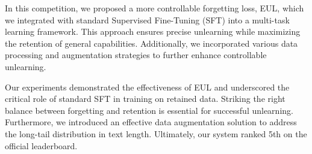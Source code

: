 \documentclass[11pt]{article}
\begin{document}

In this competition, we proposed a more controllable forgetting loss, EUL, which we integrated with standard Supervised Fine-Tuning (SFT) into a multi-task learning framework. This approach ensures precise unlearning while maximizing the retention of general capabilities. Additionally, we incorporated various data processing and augmentation strategies to further enhance controllable unlearning.

Our experiments demonstrated the effectiveness of EUL and underscored the critical role of standard SFT in training on retained data. Striking the right balance between forgetting and retention is essential for successful unlearning. Furthermore, we introduced an effective data augmentation solution to address the long-tail distribution in text length. Ultimately, our system ranked 5th on the official leaderboard.



\end{document}
